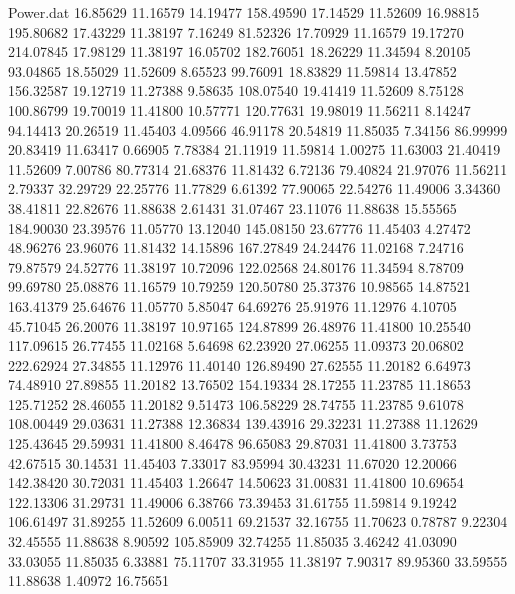 \begin{filecontents}{Power.dat}
  16.85629   11.16579   14.19477  158.49590
  17.14529   11.52609   16.98815  195.80682
  17.43229   11.38197    7.16249   81.52326
  17.70929   11.16579   19.17270  214.07845
  17.98129   11.38197   16.05702  182.76051
  18.26229   11.34594    8.20105   93.04865
  18.55029   11.52609    8.65523   99.76091
  18.83829   11.59814   13.47852  156.32587
  19.12719   11.27388    9.58635  108.07540
  19.41419   11.52609    8.75128  100.86799
  19.70019   11.41800   10.57771  120.77631
  19.98019   11.56211    8.14247   94.14413
  20.26519   11.45403    4.09566   46.91178
  20.54819   11.85035    7.34156   86.99999
  20.83419   11.63417    0.66905    7.78384
  21.11919   11.59814    1.00275   11.63003
  21.40419   11.52609    7.00786   80.77314
  21.68376   11.81432    6.72136   79.40824
  21.97076   11.56211    2.79337   32.29729
  22.25776   11.77829    6.61392   77.90065
  22.54276   11.49006    3.34360   38.41811
  22.82676   11.88638    2.61431   31.07467
  23.11076   11.88638   15.55565  184.90030
  23.39576   11.05770   13.12040  145.08150
  23.67776   11.45403    4.27472   48.96276
  23.96076   11.81432   14.15896  167.27849
  24.24476   11.02168    7.24716   79.87579
  24.52776   11.38197   10.72096  122.02568
  24.80176   11.34594    8.78709   99.69780
  25.08876   11.16579   10.79259  120.50780
  25.37376   10.98565   14.87521  163.41379
  25.64676   11.05770    5.85047   64.69276
  25.91976   11.12976    4.10705   45.71045
  26.20076   11.38197   10.97165  124.87899
  26.48976   11.41800   10.25540  117.09615
  26.77455   11.02168    5.64698   62.23920
  27.06255   11.09373   20.06802  222.62924
  27.34855   11.12976   11.40140  126.89490
  27.62555   11.20182    6.64973   74.48910
  27.89855   11.20182   13.76502  154.19334
  28.17255   11.23785   11.18653  125.71252
  28.46055   11.20182    9.51473  106.58229
  28.74755   11.23785    9.61078  108.00449
  29.03631   11.27388   12.36834  139.43916
  29.32231   11.27388   11.12629  125.43645
  29.59931   11.41800    8.46478   96.65083
  29.87031   11.41800    3.73753   42.67515
  30.14531   11.45403    7.33017   83.95994
  30.43231   11.67020   12.20066  142.38420
  30.72031   11.45403    1.26647   14.50623
  31.00831   11.41800   10.69654  122.13306
  31.29731   11.49006    6.38766   73.39453
  31.61755   11.59814    9.19242  106.61497
  31.89255   11.52609    6.00511   69.21537
  32.16755   11.70623    0.78787    9.22304
  32.45555   11.88638    8.90592  105.85909
  32.74255   11.85035    3.46242   41.03090
  33.03055   11.85035    6.33881   75.11707
  33.31955   11.38197    7.90317   89.95360
  33.59555   11.88638    1.40972   16.75651

\end{filecontents}
